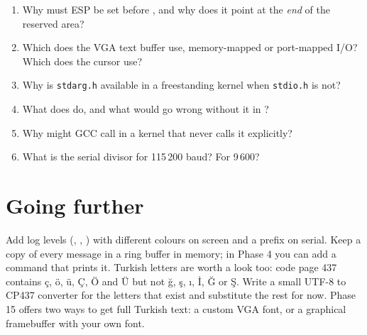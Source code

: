 \documentclass[11pt,a4paper]{article}
\begin{document}
\begin{questionbox}
\begin{enumerate}
  \item Why must ESP be set before , and why does it point at the \emph{end} of the reserved area?
  \item Which does the VGA text buffer use, memory-mapped or port-mapped I/O? Which does the cursor use?
  \item Why is \texttt{stdarg.h} available in a freestanding kernel when \texttt{stdio.h} is not?
  \item What does  do, and what would go wrong without it in ?
  \item Why might GCC call  in a kernel that never calls it explicitly?
  \item What is the serial divisor for 115\,200 baud? For 9\,600?
\end{enumerate}
\end{questionbox}

\section{Going further}

Add log levels (, , ) with different colours on screen and a prefix on serial. Keep
a copy of every message in a ring buffer in memory; in Phase 4 you can add a  command that prints it.
Turkish letters are worth a look too: code page 437 contains ç, ö, ü, Ç, Ö and Ü but not ğ, ş, ı, İ, Ğ or Ş.
Write a small UTF-8 to CP437 converter for the letters that exist and substitute the rest for now. Phase 15
offers two ways to get full Turkish text: a custom VGA font, or a graphical framebuffer with your own font.

\booklegend
\end{document}
